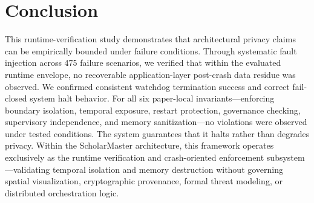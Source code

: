\documentclass[conference]{IEEEtran}
\begin{document}
\section{Conclusion}

This runtime-verification study demonstrates that architectural privacy claims can be empirically bounded under failure conditions. Through systematic fault injection across 475 failure scenarios, we verified that within the evaluated runtime envelope, no recoverable application-layer post-crash data residue was observed. We confirmed consistent watchdog termination success and correct fail-closed system halt behavior. For all six paper-local invariants---enforcing boundary isolation, temporal exposure, restart protection, governance checking, supervisory independence, and memory sanitization---no violations were observed under tested conditions. The system guarantees that it halts rather than degrades privacy. Within the ScholarMaster architecture, this framework operates exclusively as the runtime verification and crash-oriented enforcement subsystem---validating temporal isolation and memory destruction without governing spatial visualization, cryptographic provenance, formal threat modeling, or distributed orchestration logic.
\end{document}
